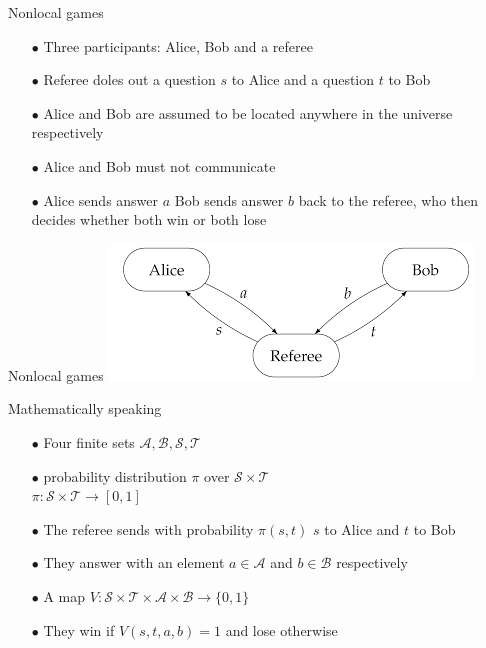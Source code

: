 \begin{frame}{Nonlocal games}
    \begin{itemize}
        \item[$\bullet$] Three participants: Alice, Bob and a referee
        \item[$\bullet$] Referee doles out a question $s$ to Alice and a question $t$ to Bob
        \item[$\bullet$] Alice and Bob are assumed to be located anywhere in the universe respectively 
        \item[$\bullet$] Alice and Bob must not communicate
        \item[$\bullet$] Alice sends answer $a$ Bob sends answer $b$ back to the referee, who then decides whether both win or both lose
    \end{itemize}
\end{frame}

\begin{frame}{Nonlocal games}
    \includegraphics[scale=0.8]{Unknown.png}
\end{frame}

\begin{frame}{Mathematically speaking}
\begin{itemize}
    \item[$\bullet$] Four finite sets $\mathcal{A}, \mathcal{B}, \mathcal{S}, \mathcal{T}$
    \item[$\bullet$] probability distribution $\pi$ over $\mathcal{S} \times \mathcal{T}$ \\ $\pi : \mathcal{S} \times \mathcal{T} \rightarrow [0,1]$
    \item[$\bullet$] The referee sends with probability $\pi (s,t)$ $s$ to Alice and $t$ to Bob
    \item[$\bullet$] They answer with an element $a \in \mathcal{A}$ and $b \in \mathcal{B}$ respectively
    \item[$\bullet$] A map $V : \mathcal{S} \times \mathcal{T} \times \mathcal{A} \times \mathcal{B} \rightarrow \{ 0, 1 \}$
    \item[$\bullet$] They win if $V(s,t,a,b)=1$ and lose otherwise
\end{itemize}
\end{frame}


